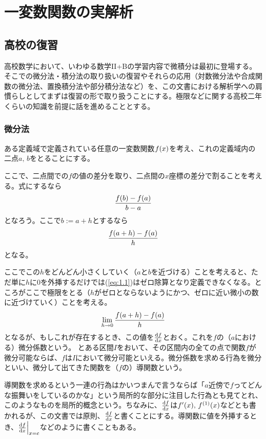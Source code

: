 \chapter{一変数関数の実解析}
\section{高校の復習}
高校数学において、いわゆる数学II+Bの学習内容で微積分は最初に登場する。そこでの微分法・積分法の取り扱いの復習やそれらの応用（対数微分法や合成関数の微分法、置換積分法や部分積分法など）を、この文書における解析学への肩慣らしとしてまずは復習の形で取り扱うことにする。極限などに関する高校二年くらいの知識を前提に話を進めることとする。
\subsection{微分法}
ある定義域で定義されている任意の一変数関数$f\pare{x}$を考え、これの定義域内の二点$a,\,b$をとることにする。

ここで、二点間での$f$の値の差分を取り、二点間の$x$座標の差分で割ることを考える。式にするなら
\begin{align*}
    \frac{f\pare{b}-f\pare{a}}{b-a}
\end{align*}
となろう。ここで$b:=a+h$とするなら
\begin{align}
    \frac{f\pare{a+h}-f\pare{a}}{h}\label{eq:1.1}
\end{align}
となる。

ここでこの$h$をどんどん小さくしていく（$a$と$b$を近づける）ことを考えると、ただ単に$h$に0を外挿するだけでは(\ref{eq:1.1})はゼロ除算となり定義できなくなる。ところがここで極限をとる（$h$がゼロとならないようにかつ、ゼロに近い微小の数に近づけていく）ことを考える。
\begin{align}
    \lim_{h\to 0}\frac{f\pare{a+h}-f\pare{a}}{h}\label{eq:1.2}
\end{align}
となるが、もしこれが存在するとき、この値を$\frac{\mathrm{d}f}{\mathrm{d}x}$とおく。これを$f$の（$a$における）微分係数という。
とある区間$I$をおいて、その区間内の全ての点で関数$f$が微分可能ならば、$f$は$I$において微分可能といえる。微分係数を求める行為を微分といい、微分して出てきた関数を（$f$の）導関数という。

導関数を求めるという一連の行為はかいつまんで言うならば「$a$近傍で$f$ってどんな振舞いをしているのかな」という局所的な部分に注目した行為とも見てとれ、このようなものを局所的概念という。ちなみに、$\frac{\mathrm{d}f}{\mathrm{d}x}$は$f'\pare{x},\,f^{\pare{1}}\pare{x}$などとも書かれるが、この文書では原則、$\frac{\mathrm{d}f}{\mathrm{d}x}$と書くことにする。導関数に値を外挿するとき、$\frac{\mathrm{d}f}{\mathrm{d}x}\Big|_{x=c}$などのように書くこともある。
